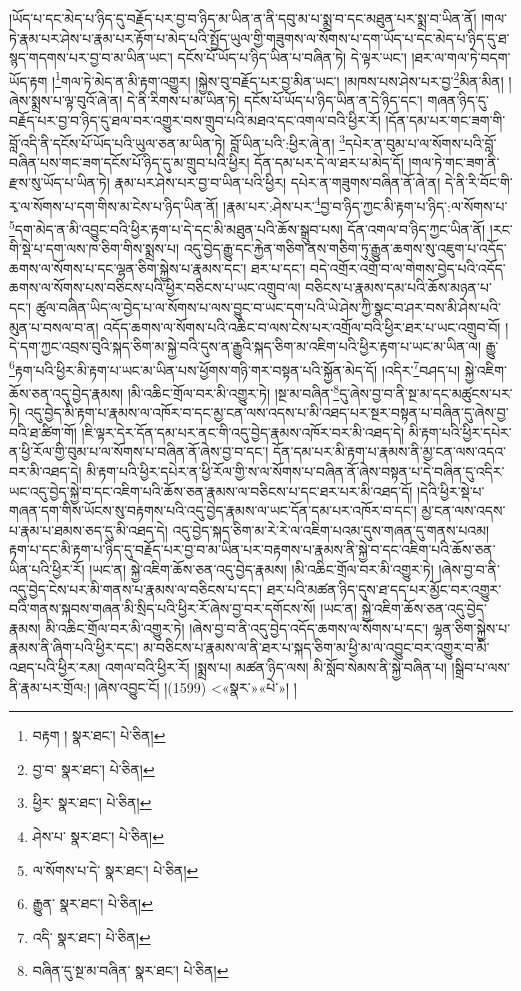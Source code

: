 །ཡོད་པ་དང་མེད་པ་ཉིད་དུ་བརྗོད་པར་བྱ་བ་ཉིད་མ་ཡིན་ན་ནི་དབུ་མ་པ་སྨྲ་བ་དང་མཐུན་པར་སྨྲ་བ་ཡིན་ནོ། །གལ་ཏེ་རྣམ་པར་ཤེས་པ་རྣམ་པར་རྟོག་པ་མེད་པའི་སྤྱོད་ཡུལ་གྱི་གཟུགས་ལ་སོགས་པ་དག་ཡོད་པ་དང་མེད་པ་ཉིད་དུ་ཐ་སྙད་གདགས་པར་བྱ་བ་མ་ཡིན་ཡང་། དངོས་པོ་ཡོད་པ་ཉིད་ཡིན་པ་བཞིན་ཏེ། དེ་ལྟར་ཡང་། །ཐར་ལ་གལ་ཏེ་བདག་ཡོད་རྟག །\footnote{བརྟག །  སྣར་ཐང་།  པེ་ཅིན། }གལ་ཏེ་མེད་ན་མི་རྟག་འགྱུར། །སྐྱེས་བུ་བརྗོད་པར་བྱ་མིན་ཡང་། །མཁས་པས་ཤེས་པར་བྱ་\footnote{བྱ་བ་  སྣར་ཐང་།  པེ་ཅིན། }མིན་མིན། །ཞེས་སྨྲས་པ་ལྟ་བུའོ་ཞེ་ན། དེ་ནི་རིགས་པ་མ་ཡིན་ཏེ། དངོས་པོ་ཡོད་པ་ཉིད་ཡིན་ན་དེ་ཉིད་དང་། གཞན་ཉིད་དུ་བརྗོད་པར་བྱ་བ་ཉིད་དུ་ཐལ་བར་འགྱུར་བས་གྲུབ་པའི་མཐའ་དང་འགལ་བའི་ཕྱིར་རོ། །དོན་དམ་པར་གང་ཟག་གི་བློ་འདི་ནི་དངོས་པོ་ཡོད་པའི་ཡུལ་ཅན་མ་ཡིན་ཏེ། བློ་ཡིན་པའི་:ཕྱིར་ཞེ་ན། \footnote{ཕྱིར་  སྣར་ཐང་།  པེ་ཅིན། }དཔེར་ན་བུམ་པ་ལ་སོགས་པའི་བློ་བཞིན་པས་གང་ཟག་དངོས་པོ་ཉིད་དུ་མ་གྲུབ་པའི་ཕྱིར། དོན་དམ་པར་དེ་ལ་ཐར་པ་མེད་དོ། །གལ་ཏེ་གང་ཟག་ནི་རྫས་སུ་ཡོད་པ་ཡིན་ཏེ། རྣམ་པར་ཤེས་པར་བྱ་བ་ཡིན་པའི་ཕྱིར། དཔེར་ན་གཟུགས་བཞིན་ནོ་ཞེ་ན། དེ་ནི་རི་བོང་གི་རྭ་ལ་སོགས་པ་དག་གིས་མ་ངེས་པ་ཉིད་ཡིན་ནོ། །རྣམ་པར་:ཤེས་པར་\footnote{ཤེས་པ་  སྣར་ཐང་།  པེ་ཅིན། }བྱ་བ་ཉིད་ཀྱང་མི་རྟག་པ་ཉིད་:ལ་སོགས་པ་\footnote{ལ་སོགས་པ་དེ་  སྣར་ཐང་།  པེ་ཅིན། }དག་མེད་ན་མི་འབྱུང་བའི་ཕྱིར་རྟག་པ་དེ་དང་མི་མཐུན་པའི་ཆོས་སྒྲུབ་པས། དོན་འགལ་བ་ཉིད་ཀྱང་ཡིན་ནོ། །རང་གི་སྡེ་པ་དག་ལས་ཁ་ཅིག་གིས་སྨྲས་པ། འདུ་བྱེད་རྒྱུ་དང་རྐྱེན་གཅིག་ནས་གཅིག་ཏུ་རྒྱུན་ཆགས་སུ་འཇུག་པ་འདོད་ཆགས་ལ་སོགས་པ་དང་ལྷན་ཅིག་སྐྱེས་པ་རྣམས་དང་། ཐར་པ་དང་། བདེ་འགྲོར་འགྲོ་བ་ལ་གེགས་བྱེད་པའི་འདོད་ཆགས་ལ་སོགས་པས་བཅིངས་པའི་ཕྱིར་བཅིངས་པ་ཡང་འགྲུབ་ལ། བཅིངས་པ་རྣམས་དམ་པའི་ཆོས་མཉན་པ་དང་། ཚུལ་བཞིན་ཡིད་ལ་བྱེད་པ་ལ་སོགས་པ་ལས་བྱུང་བ་ཡང་དག་པའི་ཡེ་ཤེས་ཀྱི་སྣང་བ་ཤར་བས་མི་ཤེས་པའི་མུན་པ་བསལ་བ་ན། འདོད་ཆགས་ལ་སོགས་པའི་འཆིང་བ་ལས་ངེས་པར་འགྲོལ་བའི་ཕྱིར་ཐར་པ་ཡང་འགྲུབ་བོ། །དེ་དག་ཀྱང་འབྲས་བུའི་སྐད་ཅིག་མ་སྐྱེ་བའི་དུས་ན་རྒྱུའི་སྐད་ཅིག་མ་འཇིག་པའི་ཕྱིར་རྟག་པ་ཡང་མ་ཡིན་ལ། རྒྱུ་\footnote{རྒྱུན་  སྣར་ཐང་།  པེ་ཅིན། }རྟག་པའི་ཕྱིར་མི་རྟག་པ་ཡང་མ་ཡིན་པས་ཕྱོགས་གཉི་གར་བསྟན་པའི་སྐྱོན་མེད་དོ། །འདིར་\footnote{འདི་  སྣར་ཐང་།  པེ་ཅིན། }བཤད་པ། སྐྱེ་འཇིག་ཆོས་ཅན་འདུ་བྱེད་རྣམས། །མི་འཆིང་གྲོལ་བར་མི་འགྱུར་ཏེ། །སྔ་མ་བཞིན་\footnote{བཞིན་དུ་སྔ་མ་བཞིན་  སྣར་ཐང་།  པེ་ཅིན། }དུ་ཞེས་བྱ་བ་ནི་སྔ་མ་དང་མཚུངས་པར་ཏེ། འདུ་བྱེད་མི་རྟག་པ་རྣམས་ལ་འཁོར་བ་དང་མྱ་ངན་ལས་འདས་པ་མི་འཐད་པར་སྔར་བསྟན་པ་བཞིན་དུ་ཞེས་བྱ་བའི་ཐ་ཚིག་གོ། །ཇི་ལྟར་དེར་དོན་དམ་པར་ནང་གི་འདུ་བྱེད་རྣམས་འཁོར་བར་མི་འཐད་དེ། མི་རྟག་པའི་ཕྱིར་དཔེར་ན་ཕྱི་རོལ་གྱི་བུམ་པ་ལ་སོགས་པ་བཞིན་ནོ་ཞེས་བྱ་བ་དང་། དོན་དམ་པར་མི་རྟག་པ་རྣམས་ནི་མྱ་ངན་ལས་འདའ་བར་མི་འཐད་དེ། མི་རྟག་པའི་ཕྱིར་དཔེར་ན་ཕྱི་རོལ་གྱི་ས་ལ་སོགས་པ་བཞིན་ནོ་ཞེས་བསྟན་པ་དེ་བཞིན་དུ་འདིར་ཡང་འདུ་བྱེད་སྐྱེ་བ་དང་འཇིག་པའི་ཆོས་ཅན་རྣམས་ལ་བཅིངས་པ་དང་ཐར་པར་མི་འཐད་དོ། །དེའི་ཕྱིར་སྡེ་པ་གཞན་དག་གིས་ཡོངས་སུ་བརྟགས་པའི་འདུ་བྱེད་རྣམས་ལ་ཡང་དོན་དམ་པར་འཁོར་བ་དང་། མྱ་ངན་ལས་འདས་པ་རྣམ་པ་ཐམས་ཅད་དུ་མི་འཐད་དེ། འདུ་བྱེད་སྐད་ཅིག་མ་རེ་རེ་ལ་འཇིག་པའམ་དུས་གཞན་དུ་གནས་པའམ། རྟག་པ་དང་མི་རྟག་པ་ཉིད་དུ་བརྗོད་པར་བྱ་བ་མ་ཡིན་པར་བརྟགས་པ་རྣམས་ནི་སྐྱེ་བ་དང་འཇིག་པའི་ཆོས་ཅན་ཡིན་པའི་ཕྱིར་རོ། །ཡང་ན། སྐྱེ་འཇིག་ཆོས་ཅན་འདུ་བྱེད་རྣམས། །མི་འཆིང་གྲོལ་བར་མི་འགྱུར་ཏེ། །ཞེས་བྱ་བ་ནི་འདུ་བྱེད་ངེས་པར་མི་གནས་པ་རྣམས་ལ་བཅིངས་པ་དང་། ཐར་པའི་མཚན་ཉིད་དུས་ཐ་དད་པར་མྱོང་བར་འགྱུར་བའི་གནས་སྐབས་གཞན་མི་སྲིད་པའི་ཕྱིར་རོ་ཞེས་བྱ་བར་དགོངས་སོ། །ཡང་ན། སྐྱེ་འཇིག་ཆོས་ཅན་འདུ་བྱེད་རྣམས། མི་འཆིང་གྲོལ་བར་མི་འགྱུར་ཏེ། །ཞེས་བྱ་བ་ནི་འདུ་བྱེད་འདོད་ཆགས་ལ་སོགས་པ་དང་། ལྷན་ཅིག་སྐྱེས་པ་རྣམས་ནི་ཞིག་པའི་ཕྱིར་དང་། མ་བཅིངས་པ་རྣམས་ལ་ནི་ཐར་པ་སྐད་ཅིག་མ་ཕྱི་མ་ལ་འབྱུང་བར་འགྱུར་བ་མི་འཐད་པའི་ཕྱིར་རམ། འགལ་བའི་ཕྱིར་རོ། །སྨྲས་པ། མཚན་ཉིད་ལས། མི་སློབ་སེམས་ནི་སྐྱེ་བཞིན་པ། །སྒྲིབ་པ་ལས་ནི་རྣམ་པར་གྲོལ:། །ཞེས་འབྱུང་ངོ། །(1599) <«སྣར་»«པེ་»། །
